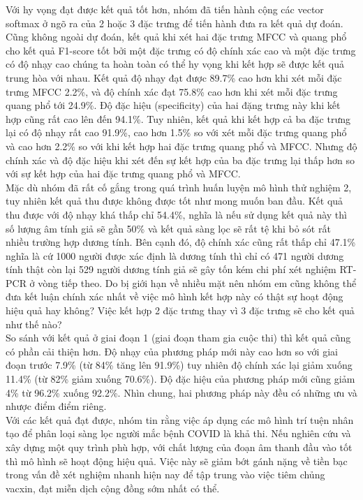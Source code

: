 \documentclass[a4paper, 12pt]{article}
\begin{document}
\noindent
Với hy vọng đạt được kết quả tốt hơn, nhóm đã tiến hành cộng các vector softmax ở ngõ ra của 2 hoặc 3 đặc trưng để tiến hành đưa ra kết quả dự đoán. Cũng không ngoài dự đoán, kết quả khi xét hai đặc trưng MFCC và quang phổ cho kết quả F1-score tốt bởi một đặc trưng có độ chính xác cao và một đặc trưng có độ nhạy cao chúng ta hoàn toàn có thể hy vọng khi kết hợp sẽ được kết quả trung hòa với nhau. Kết quả độ nhạy đạt được 89.7\% cao hơn khi xét mỗi đặc trưng MFCC 2.2\%, và độ chính xác đạt 75.8\% cao hơn khi xét mỗi đặc trưng quang phổ tới 24.9\%. Độ đặc hiệu (specificity) của hai đặng trưng này khi kết hợp cũng rất cao lên đến 94.1\%. Tuy nhiên, kết quả khi kết hợp cả ba đặc trưng lại có độ nhạy rất cao 91.9\%, cao hơn 1.5\% so với xét mỗi đặc trưng quang phổ và cao hơn 2.2\% so với khi kết hợp hai đặc trưng quang phổ và MFCC. Nhưng độ chính xác và độ đặc hiệu khi xét đến sự kết hợp của ba đặc trưng lại thấp hơn so với sự kết hợp của hai đặc trưng quang phổ và MFCC.\\

\noindent
Mặc dù nhóm đã rất cố gắng trong quá trình huấn luyện mô hình thử nghiệm 2, tuy nhiên kết quả thu được không được tốt như mong muốn ban đầu. Kết quả thu được với độ nhạy khá thấp chỉ 54.4\%, nghĩa là nếu sử dụng kết quả này thì số lượng âm tính giả sẽ gần 50\% và kết quả sàng lọc sẽ rất tệ khi bỏ sót rất nhiều trường hợp dương tính. Bên cạnh đó, độ chính xác cũng rất thấp chỉ 47.1\% nghĩa là cứ 1000 người được xác định là dương tính thì chỉ có 471 người dương tính thật còn lại 529 người dương tính giả sẽ gây tốn kém chi phí xét nghiệm RT-PCR ở vòng tiếp theo. Do bị giới hạn về nhiều mặt nên nhóm em cũng không thể đưa kết luận chính xác nhất về việc mô hình kết hợp này có thật sự hoạt động hiệu quả hay không? Việc kết hợp 2 đặc trưng thay vì 3 đặc trưng sẽ cho kết quả như thế nào? \\

\noindent
So sánh với kết quả ở giai đoạn 1 (giai đoạn tham gia cuộc thi) thì kết quả cũng có phần cải thiện hơn. Độ nhạy của phương pháp mới này cao hơn so với giai đoạn trước 7.9\% (từ 84\% tăng lên 91.9\%) tuy nhiên độ chính xác lại giảm xuống 11.4\% (từ 82\% giảm xuống 70.6\%). Độ đặc hiệu của phương pháp mới cũng giảm 4\% từ 96.2\% xuống 92.2\%. Nhìn chung, hai phương pháp này đều có những ưu và nhược điểm điểm riêng. \\

\noindent
Với các kết quả đạt được, nhóm tin rằng việc áp dụng các mô hình trí tuện nhân tạo để phân loại sàng lọc người mắc bệnh COVID là khả thi. Nếu nghiên cứu và xây dựng một quy trình phù hợp, với chất lượng của đoạn âm thanh đầu vào tốt thì mô hình sẽ hoạt động hiệu quả. Việc này sẽ giảm bớt gánh nặng về tiền bạc trong vấn đề xét nghiệm nhanh hiện nay để tập trung vào việc tiêm chủng vacxin, đạt miễn dịch cộng đồng sớm nhất có thể.\\\

\newpage
\renewcommand{\bibname}{Tài liệu tham khảo}

\printbibliography
\end{document}
